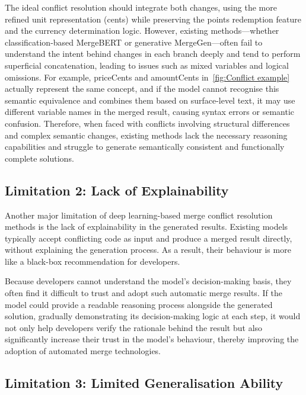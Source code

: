 \documentclass[sigconf,review,anonymous]{acmart}
\begin{document}
The ideal conflict resolution should integrate both changes, using the more refined unit representation (cents) while preserving the points redemption feature and the currency determination logic.  However, existing methods—whether classification-based MergeBERT or generative MergeGen—often fail to understand the intent behind changes in each branch deeply and tend to perform superficial concatenation, leading to issues such as mixed variables and logical omissions.
For example, priceCents and amountCents in~\autoref{fig:Conflict example} actually represent the same concept, and if the model cannot recognise this semantic equivalence and combines them based on surface-level text, it may use different variable names in the merged result, causing syntax errors or semantic confusion. Therefore, when faced with conflicts involving structural differences and complex semantic changes, existing methods lack the necessary reasoning capabilities and struggle to generate semantically consistent and functionally complete solutions.

\subsection{Limitation 2: Lack of Explainability}

Another major limitation of deep learning-based merge conflict resolution methods is the lack of explainability in the generated results. 
Existing models typically accept conflicting code as input and produce a merged result directly, without explaining the generation process. 
As a result, their behaviour is more like a black-box recommendation for developers. 

Because developers cannot understand the model’s decision-making basis, they often find it difficult to trust and adopt such automatic merge results. If the model could provide a readable reasoning process alongside the generated solution, gradually demonstrating its decision-making logic at each step, it would not only help developers verify the rationale behind the result but also significantly increase their trust in the model’s behaviour, thereby improving the adoption of automated merge technologies.

\subsection{Limitation 3: Limited Generalisation Ability}
\end{document}
